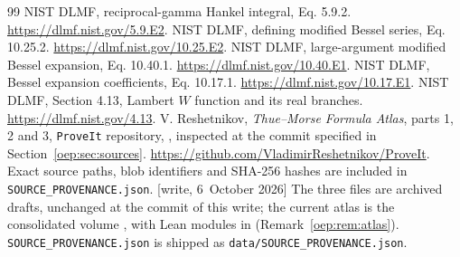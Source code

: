 \documentclass[11pt,letterpaper]{article}
\theoremstyle{remark}\newtheorem{remark}[theorem]{Remark}
\newcommand{\file}[1]{\nolinkurl{#1}}
\begin{document}
\begin{thebibliography}{99}
 NIST DLMF, reciprocal-gamma Hankel integral, Eq. 5.9.2. \url{https://dlmf.nist.gov/5.9.E2}.
 NIST DLMF, defining modified Bessel series, Eq. 10.25.2. \url{https://dlmf.nist.gov/10.25.E2}.
 NIST DLMF, large-argument modified Bessel expansion, Eq. 10.40.1. \url{https://dlmf.nist.gov/10.40.E1}.
 NIST DLMF, Bessel expansion coefficients, Eq. 10.17.1. \url{https://dlmf.nist.gov/10.17.E1}.
 NIST DLMF, Section 4.13, Lambert $W$ function and its real branches. \url{https://dlmf.nist.gov/4.13}.
 V. Reshetnikov, \emph{Thue--Morse Formula Atlas}, parts 1, 2 and 3, \texttt{ProveIt} repository, , inspected at the commit specified in Section~\ref{oep:sec:sources}. \url{https://github.com/VladimirReshetnikov/ProveIt}. Exact source paths, blob identifiers and SHA-256 hashes are included in \texttt{SOURCE\_PROVENANCE.json}.
\textup{[write, 6~October 2026]} The three files are archived drafts, unchanged at the commit of this write; the current atlas is the consolidated volume , with Lean modules in  (Remark~\ref{oep:rem:atlas}). \texttt{SOURCE\_PROVENANCE.json} is shipped as \file{data/SOURCE_PROVENANCE.json}.
\end{thebibliography}
\end{document}
